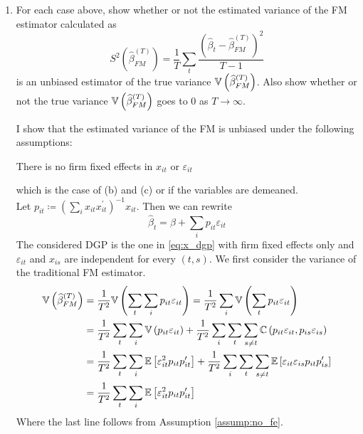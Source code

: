 \documentclass[12pt,twoside]{article}
\begin{document}
\begin{enumerate}[label = (\alph*)]
    \item For each case above, show whether or not the estimated variance of the FM estimator calculated as 
    \[
        S^2\left(\widehat\beta^{(T)}_{FM}\right) = \frac{1}{T} \sum_t \frac{\left(\widehat\beta_t-\widehat\beta_{FM}^{(T)}\right)^2}{T-1}
    \]
    is an unbiased estimator of the true variance \(\mathbb{V}\left(\widehat\beta_{FM}^{(T)}\right)\). Also show whether or not the true variance \(\mathbb{V}\left(\widehat\beta^{(T)}_{FM}\right)\) goes to 0 as \(T \to \infty\).
    \begin{solution}
        I show that the estimated variance of the FM is unbiased under the following assumptions:
        \begin{assump}
            \label{assump:no_fe}
            There is no firm fixed effects in \(x_{it}\) or \(\varepsilon_{it}\)
        \end{assump}
        which is the case of (b) and (c) or if the variables are demeaned. \\
        Let \(p_{it} \coloneqq \left(\sum_i x_{it}x_{it}^\prime\right)^{-1}x_{it}\). Then we can rewrite 
        \[
            \widehat\beta_t = \beta + \sum_i p_{it}\varepsilon_{it}
        \]
        The considered DGP is the one in \eqref{eq:x_dgp} with firm fixed effects only and \(\varepsilon_{it}\) and \(x_{is}\) are independent for every \((t,s)\). We first consider the variance of the traditional FM estimator. 
        \begin{align*}
            \mathbb{V}\left(\widehat\beta^{(T)}_{FM}\right) & = \frac{1}{T^2} \mathbb{V}\left(\sum_t\sum_i p_{it}\varepsilon_{it}\right) = \frac{1}{T^2}\sum_i \mathbb{V}\left(\sum_t p_{it}\varepsilon_{it}\right) \\
            & = \frac{1}{T^2}\sum_t\sum_i \mathbb{V}\left(p_{it}\varepsilon_{it}\right) + \frac{1}{T^2}\sum_i\sum_t\sum_{s\neq t}\mathbb{C}\left(p_{it}\varepsilon_{it},p_{is}\varepsilon_{is} \right) \\
            & = \frac{1}{T^2}\sum_t\sum_i \mathbb{E}\left[\varepsilon_{it}^2p_{it}p_{it}^\prime\right] + \frac{1}{T^2}\sum_i\sum_t\sum_{s\neq t}\mathbb{E}\left[\varepsilon_{it}\varepsilon_{is}p_{it}p_{is}^\prime\right] \\
            & = \frac{1}{T^2}\sum_t\sum_i\mathbb{E}\left[\varepsilon_{it}^2 p_{it}p_{it}^\prime\right] 
        \end{align*}
        Where the last line follows from Assumption \ref{assump:no_fe}.
        

\end{solution}
\end{enumerate}
\end{document}
